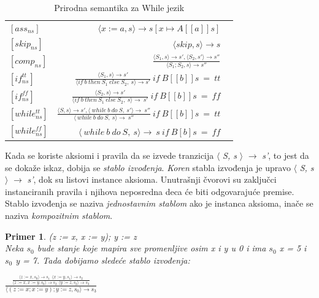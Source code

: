 \documentclass[a4paper]{article}
\newtheorem{primer}{Primer}[section]
\begin{document}
{\begin{table}[h]
       \caption{Prirodna semantika za While jezik}
    	\begin{center}
        \begin{tabular}{lrc}\hline
        \hline
        \hline
        $[ass_{ns}] $ & $ \langle x := a, s \rangle \rightarrow s[x \mapsto A[[a]]s]$    \\  [6pt]
        $[skip_{ns}] $ & $ \langle skip, s \rangle \rightarrow s$   \\ [6pt]
         $[comp_{ns}] $ & $ \frac{\langle S_1, s \rangle \rightarrow s', \langle S_2, s' \rangle \rightarrow s''}{\langle S_1;S_2, s \rangle \rightarrow s''}$ \\[6pt]
            $[if^{tt}_{ns}] $ & $ \frac{\langle S_1, s \rangle \rightarrow s'}{\langle if\ b\ then\ S_1\ else\ S_2,\ s \rangle \rightarrow s'}\  if\ B[[b]]s\ =\ tt $ \\ [6pt]
            $[if^{ff}_{ns}] $ & $ \frac{\langle S_2, s \rangle \rightarrow s'}{\langle if\ b\ then\ S_1\ else\ S_2,\ s \rangle \rightarrow\ s'}\  if\ B[[b]]s\ =\ ff $ \\ [6pt]
            $[while^{tt}_{ns}] $ & $ \frac{\langle S, s \rangle \rightarrow s', \langle\ while\ b\ do\ S,\ s' \rangle \rightarrow\ s''}{\langle\ while\ b\ do\ S,\ s \rangle \rightarrow\ s''}\ if\ B[[b]]s\ =\ tt $ \\ [6pt]
             $[while^{ff}_{ns}] $ & $ \langle\ while\ b\ do\ S,\ s \rangle \rightarrow\ s\ if\ B[b]s\ =\ ff$ \\ [6pt]
          \hline \hline
        \end{tabular}
     \label{tab:b}
    \end{center}
\end{table}

Kada se koriste aksiomi i pravila da se izvede tranzicija $\langle$ \textit{S, s} $\rangle$ $\rightarrow$ \textit{s'}, to jest da se dokaže iskaz, dobija se \textit{stablo izvođenja}. \textit{Koren} stabla izvođenja je upravo $\langle$ \textit{S, s} $\rangle$ $\rightarrow$ \textit{s'}, dok su listovi instance aksioma. Unutrašnji čvorovi su zaključci instanciranih pravila i njihova neposredna deca će biti odgovarajuće premise. Stablo izvođenja se naziva \textit{jednostavnim stablom} ako je instanca aksioma, inače se naziva \textit{kompozitnim stablom}.\\

\begin{primer}
(z := x, x := y); y := z \\
Neka $s_0$ bude stanje koje mapira sve promenljive osim x i y u 0 i ima $s_0$ x = 5 i $s_0$ y = 7. Tada dobijamo sledeće stablo izvođenja:
\end{primer}
{\Large\begin{center}$\frac{\frac{\langle z := x, s_0 \rangle \rightarrow s_1\ \ \langle x := y, s_1 \rangle \rightarrow s_2}{\langle z := x, x := y, s_0\rangle \rightarrow s_2\ \ \langle y := z, s_2 \rangle \rightarrow s_3}}{\langle (z := x; x := y); y := z, s_0 \rangle \rightarrow s_3}$ \end{center}}

}
\end{document}
